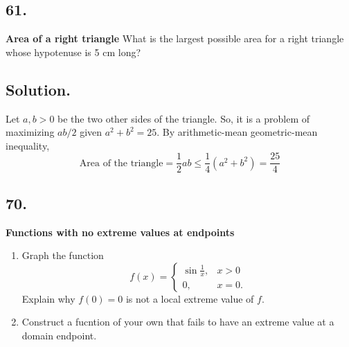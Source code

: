 \documentclass{article}
\begin{document}
\subsection*{61.}
\textbf{Area of a right triangle} What is the largest possible area for a right triangle whose hypotenuse is 5 cm long?
\subsection*{Solution.}
Let $a,b>0$ be the two other sides of the triangle.
So, it is a problem of maximizing $ab/2$ given $a^2+b^2=25$.\newline
By arithmetic-mean geometric-mean inequality, 
\[\text{Area of the triangle}=\frac{1}{2}ab\leq \frac{1}{4}(a^2+b^2)=\frac{25}{4}\]
\subsection*{70.}
\textbf{Functions with no extreme values at endpoints}
\begin{enumerate} [label=\textbf{\alph*.}]
    \item Graph the function 
    \[f(x)=\left\{\begin{array}{ll}
    \sin\frac{1}{x}, & x>0 \\
    0, & x=0.
    \end{array}\right.\]
    Explain why $f(0)=0$ is not a local extreme value of $f$.
    \item Construct a fucntion of your own that fails to have an extreme value at a domain endpoint.
\end{enumerate}
\end{document}
